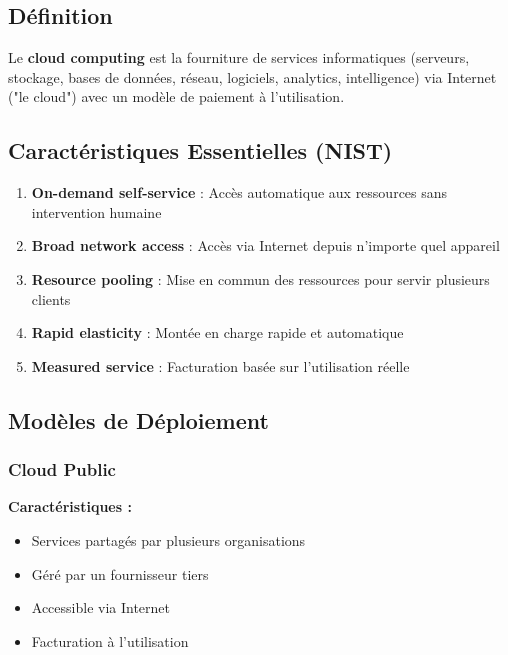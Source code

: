 \documentclass[11pt,a4paper]{article}
\begin{document}
\subsection{Définition}

\begin{definitionbox}
Le \textbf{cloud computing} est la fourniture de services informatiques (serveurs, stockage, bases de données, réseau, logiciels, analytics, intelligence) via Internet ("le cloud") avec un modèle de paiement à l'utilisation.
\end{definitionbox}

\subsection{Caractéristiques Essentielles (NIST)}

\begin{enumerate}
    \item \textbf{On-demand self-service} : Accès automatique aux ressources sans intervention humaine
    \item \textbf{Broad network access} : Accès via Internet depuis n'importe quel appareil
    \item \textbf{Resource pooling} : Mise en commun des ressources pour servir plusieurs clients
    \item \textbf{Rapid elasticity} : Montée en charge rapide et automatique
    \item \textbf{Measured service} : Facturation basée sur l'utilisation réelle
\end{enumerate}

\subsection{Modèles de Déploiement}

\subsubsection{Cloud Public}

\textbf{Caractéristiques :}
\begin{itemize}
    \item Services partagés par plusieurs organisations
    \item Géré par un fournisseur tiers
    \item Accessible via Internet
    \item Facturation à l'utilisation
\end{itemize}
\end{document}
